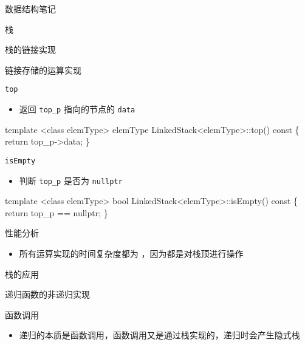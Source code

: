 \documentclass[
  ignorenonframetext,
]{beamer}
\newenvironment{Shaded}{}{}
\newcommand{\NormalTok}[1]{#1}
\providecommand{\tightlist}{%
  \setlength{\itemsep}{0pt}\setlength{\parskip}{0pt}}
\begin{document}
\begin{frame}[fragile]{数据结构笔记}
\begin{block}{栈}
\begin{block}{栈的链接实现}
\begin{block}{链接存储的运算实现}
\begin{block}{\texttt{top}}
\protect{}\label{top-1}
\begin{itemize}
\tightlist
\item
  返回 \texttt{top\_p} 指向的节点的 \texttt{data}
\end{itemize}

\begin{Shaded}
\begin{Highlighting}[]
\NormalTok{template \textless{}class elemType\textgreater{}}
\NormalTok{elemType LinkedStack\textless{}elemType\textgreater{}::top() const}
\NormalTok{\{}
\NormalTok{  return top\_p{-}\textgreater{}data;}
\NormalTok{\}}
\end{Highlighting}
\end{Shaded}
\end{block}

\begin{block}{\texttt{isEmpty}}
\protect{}\label{isempty-1}
\begin{itemize}
\tightlist
\item
  判断 \texttt{top\_p} 是否为 \texttt{nullptr}
\end{itemize}

\begin{Shaded}
\begin{Highlighting}[]
\NormalTok{template \textless{}class elemType\textgreater{}}
\NormalTok{bool LinkedStack\textless{}elemType\textgreater{}::isEmpty() const}
\NormalTok{\{}
\NormalTok{  return top\_p == nullptr;}
\NormalTok{\}}
\end{Highlighting}
\end{Shaded}
\end{block}
\end{block}

\begin{block}{性能分析}
\protect{}\label{ux6027ux80fdux5206ux6790-1}
\begin{itemize}
\tightlist
\item
  所有运算实现的时间复杂度都为 {}，因为都是对栈顶进行操作
\end{itemize}
\end{block}
\end{block}

\begin{block}{栈的应用}
\protect{}\label{ux6808ux7684ux5e94ux7528}
\begin{block}{递归函数的非递归实现}
\protect{}\label{ux9012ux5f52ux51fdux6570ux7684ux975eux9012ux5f52ux5b9eux73b0}
\begin{block}{函数调用}
\protect{}\label{ux51fdux6570ux8c03ux7528}
\begin{itemize}
\tightlist
\item
  递归的本质是函数调用，函数调用又是通过栈实现的，递归时会产生隐式栈
\end{itemize}


\end{block}
\end{block}
\end{block}
\end{block}
\end{frame}
\end{document}
